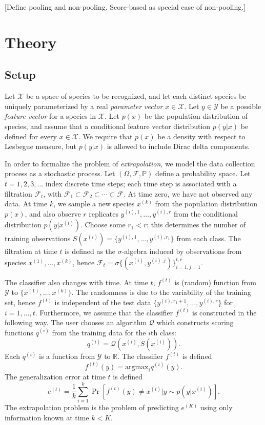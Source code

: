 \documentclass{article}
\newcommand{\argmax}{\text{argmax}}
\begin{document}
[Define pooling and non-pooling.  Score-based as special case of non-pooling.]

\section{Theory}

\subsection{Setup}

Let $\mathcal{X}$ be a space of species to be recognized, and let each
distinct species be uniquely parameterized by a real \emph{parameter
  vector} $x \in \mathcal{X}$.  Let $y \in \mathcal{Y}$ be a possible
\emph{feature vector} for a species in $\mathcal{X}$.  Let $p(x)$ be
the population distribution of species, and assume that a conditional
feature vector distribution $p(y|x)$ be defined for every $x \in
\mathcal{X}$.  We require that $p(x)$ be a density with respect to
Lesbegue measure, but $p(y|x)$ is allowed to include Dirac delta components.

In order to formalize the problem of \emph{extrapolation}, we model
the data collection process as a stochastic process.  Let $(\Omega,
\mathcal{F}, \mathbb{P})$ define a probability space.  Let $t = 1, 2,
3, \hdots $ index discrete time steps; each time step is associated
with a filtration $\mathcal{F}_t$, with $\mathcal{F}_1 \subset
\mathcal{F}_2 \subset \cdots \subset \mathcal{F}$.  At time zero, we
have not observed any data.  At time $k$, we sample a new species
$x^{(k)}$ from the population distribution $p(x)$, and also observe
$r$ replicates $y^{(i), 1}, \hdots, y^{(i), r}$ from the conditional
distribution $p(y|x^{(i)})$.  Choose some $r_1 < r$: this determines
the number of training observations $S(x^{(i)}) = \{y^{(i), 1},\hdots,
y^{(i), r_1}\}$ from each class.  The filtration at time $t$ is
defined as the $\sigma$-algebra induced by observations from species
$x^{(1)}, \hdots, x^{(k)}$, hence $\mathcal{F}_t = \sigma\{(x^{(i)},
y^{(i), j})\}_{i=1, j=1}^{t, r}$.

The classifier also changes with time.  At time $t$, $f^{(t)}$ is
(random) function from $\mathcal{Y}$ to $\{x^{(1)}, \hdots,
x^{(k)}\}$.  The randomness is due to the variability of the training
set, hence $f^{(t)}$ is independent of the test data $\{y^{(i), r_1 +
  1}, \hdots, y^{(i), r}\}$ for $i = 1,\hdots, t$.  Furthermore, we
assume that the classifier $f^{(t)}$ is constructed in the following
way.  The user chooses an algorithm $\mathcal{Q}$ which constructs
scoring functions $q^{(i)}$ from the training data for the $i$th
class:
\[
q^{(i)} = \mathcal{Q}(x^{(i)}, S(x^{(i)})).
\]
Each $q^{(i)}$ is a function from $\mathcal{Y}$ to $\mathbb{R}$.  The
classifier $f^{(t)}$ is defined
\[
f^{(t)}(y) = \argmax_i q^{(i)}(y).
\]
The generalization error at time $t$ is defined
\[
e^{(t)} = \frac{1}{k}\sum_{i=1}^k \Pr[f^{(t)}(y) \neq x^{(i)}|y \sim p(y|x^{(i)})].
\]
The extrapolation problem is the problem of predicting $e^{(K)}$ using
only information known at time $k < K$.
\end{document}

